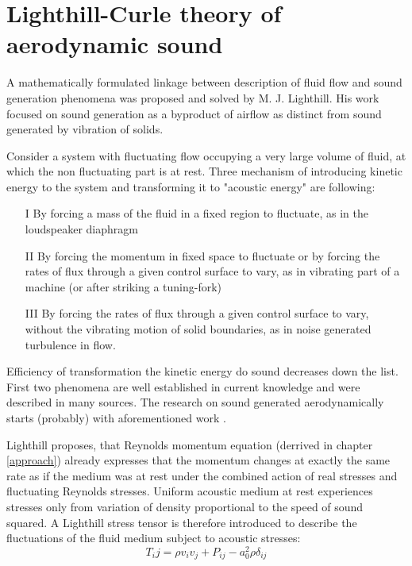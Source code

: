 \section{Lighthill-Curle theory of aerodynamic sound}
A mathematically formulated linkage between description of fluid flow and sound generation phenomena was proposed and solved by M. J. Lighthill.  His work \citep{Light1} focused on sound generation as a byproduct of airflow as distinct from sound generated by vibration of solids.

Consider a system with fluctuating flow occupying a very large volume of fluid, at which the non fluctuating part is at rest. Three mechanism of introducing kinetic energy to the system and transforming it to "acoustic energy" are following:

\begin{itemize}
\item[I] By forcing a mass of the fluid in a fixed region to fluctuate, as in the loudspeaker diaphragm
\item[II] By forcing the momentum in fixed space to fluctuate or by forcing the rates of flux through a given control surface to vary, as in vibrating part of a machine (or after striking a tuning-fork)
\item[III] By forcing the rates of flux through a given control surface to vary, without the vibrating motion of solid boundaries, as in noise generated turbulence in flow.
\end{itemize}

Efficiency of transformation the kinetic energy do sound decreases down the list. First two phenomena are well established in current knowledge and were described in many sources. The research on sound generated aerodynamically starts (probably) with aforementioned work \citep{Light2}.

Lighthill proposes, that Reynolds momentum equation (derrived in chapter \ref{approach}) already expresses that the momentum changes at exactly the same rate as if the medium was at rest under the combined action of real stresses and fluctuating Reynolds stresses. Uniform acoustic medium at rest experiences stresses only from variation of density proportional to the speed of sound squared. A Lighthill stress tensor is therefore introduced to describe the fluctuations of the fluid medium subject to acoustic stresses:
\begin{equation} \label{eq:lighttensor}
T_ij = \rho v_i v_j + P_{ij} - a_0^2 \rho \delta_{ij}
\end{equation}

